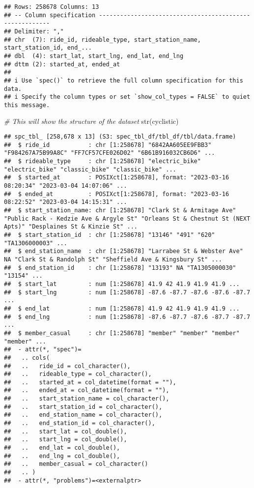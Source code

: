 \documentclass[
]{article}
\newenvironment{Shaded}{\begin{snugshade}}{\end{snugshade}}
\newcommand{\CommentTok}[1]{\textcolor[rgb]{0.56,0.35,0.01}{\textit{#1}}}
\newcommand{\FunctionTok}[1]{\textcolor[rgb]{0.00,0.00,0.00}{#1}}
\newcommand{\NormalTok}[1]{#1}
\begin{document}
\begin{verbatim}
## Rows: 258678 Columns: 13
## -- Column specification --------------------------------------------------------
## Delimiter: ","
## chr  (7): ride_id, rideable_type, start_station_name, start_station_id, end_...
## dbl  (4): start_lat, start_lng, end_lat, end_lng
## dttm (2): started_at, ended_at
## 
## i Use `spec()` to retrieve the full column specification for this data.
## i Specify the column types or set `show_col_types = FALSE` to quiet this message.
\end{verbatim}

\begin{Shaded}
\begin{Highlighting}[]
\CommentTok{\# This will show the structure of the dataset}
\FunctionTok{str}\NormalTok{(cyclistic)}
\end{Highlighting}
\end{Shaded}

\begin{verbatim}
## spc_tbl_ [258,678 x 13] (S3: spec_tbl_df/tbl_df/tbl/data.frame)
##  $ ride_id           : chr [1:258678] "6842AA605EE9FBB3" "F984267A75B99A8C" "FF7CF57CFE026D02" "6B61B916032CB6D6" ...
##  $ rideable_type     : chr [1:258678] "electric_bike" "electric_bike" "classic_bike" "classic_bike" ...
##  $ started_at        : POSIXct[1:258678], format: "2023-03-16 08:20:34" "2023-03-04 14:07:06" ...
##  $ ended_at          : POSIXct[1:258678], format: "2023-03-16 08:22:52" "2023-03-04 14:15:31" ...
##  $ start_station_name: chr [1:258678] "Clark St & Armitage Ave" "Public Rack - Kedzie Ave & Argyle St" "Orleans St & Chestnut St (NEXT Apts)" "Desplaines St & Kinzie St" ...
##  $ start_station_id  : chr [1:258678] "13146" "491" "620" "TA1306000003" ...
##  $ end_station_name  : chr [1:258678] "Larrabee St & Webster Ave" NA "Clark St & Randolph St" "Sheffield Ave & Kingsbury St" ...
##  $ end_station_id    : chr [1:258678] "13193" NA "TA1305000030" "13154" ...
##  $ start_lat         : num [1:258678] 41.9 42 41.9 41.9 41.9 ...
##  $ start_lng         : num [1:258678] -87.6 -87.7 -87.6 -87.6 -87.7 ...
##  $ end_lat           : num [1:258678] 41.9 42 41.9 41.9 41.9 ...
##  $ end_lng           : num [1:258678] -87.6 -87.7 -87.6 -87.7 -87.7 ...
##  $ member_casual     : chr [1:258678] "member" "member" "member" "member" ...
##  - attr(*, "spec")=
##   .. cols(
##   ..   ride_id = col_character(),
##   ..   rideable_type = col_character(),
##   ..   started_at = col_datetime(format = ""),
##   ..   ended_at = col_datetime(format = ""),
##   ..   start_station_name = col_character(),
##   ..   start_station_id = col_character(),
##   ..   end_station_name = col_character(),
##   ..   end_station_id = col_character(),
##   ..   start_lat = col_double(),
##   ..   start_lng = col_double(),
##   ..   end_lat = col_double(),
##   ..   end_lng = col_double(),
##   ..   member_casual = col_character()
##   .. )
##  - attr(*, "problems")=<externalptr>
\end{verbatim}
\end{document}
